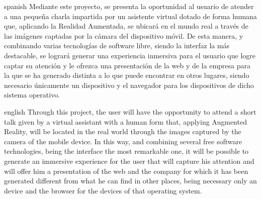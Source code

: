 \documentclass{subfiles}
\begin{document}
    \begin{abstractpage}
        \begin{abstract-lang}{spanish}
            Mediante este proyecto, se presenta la oportunidad al usuario de atender a una pequeña charla impartida por un asistente virtual dotado de forma humana que, aplicando la Realidad Aumentada, se ubicará en el mundo real a través de las imágenes captadas por la cámara del dispositivo móvil. De esta manera, y combinando varias tecnologías de software libre, siendo la interfaz \webxr la más destacable, se logrará generar una experiencia inmersiva para el usuario que logre captar su atención y le ofrezca una presentación de la web y de la empresa para la que se ha generado distinta a lo que puede encontrar en otros lugares, siendo necesario únicamente un dispositivo \android y el navegador \googlechrome para los dispositivos de dicho sistema operativo.
        \end{abstract-lang}
    
        \begin{abstract-lang}{english}
            Through this project, the user will have the opportunity to attend a short talk given by a virtual assistant with a human form that, applying Augmented Reality, will be located in the real world through the images captured by the camera of the mobile device. In this way, and combining several free software technologies, being the \webxr interface the most remarkable one, it will be possible to generate an immersive experience for the user that will capture his attention and will offer him a presentation of the web and the company for which it has been generated different from what he can find in other places, being necessary only an \android device and the \googlechrome browser for the devices of that operating system.
        \end{abstract-lang}
    \end{abstractpage}
\end{document}
